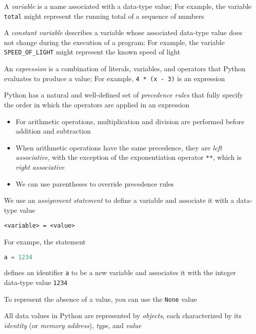 \documentclass[8pt,a4paper,compress]{beamer}
\begin{document}
\begin{frame}[fragile]
A \emph{variable} is a name associated with a data-type value; For example, the variable \lstinline{total} might represent the running total of a sequence of numbers

\bigskip

A \emph{constant variable} describes a variable whose associated data-type value does not change during the execution of a program; For example, the variable \lstinline{SPEED_OF_LIGHT} might represent the known speed of light

\bigskip

An \emph{expression} is a combination of literals, variables, and operators that Python evaluates to produce a value; For example, \lstinline{4 * (x - 3)} is an expression

\bigskip

Python has a natural and well-defined set of \emph{precedence rules} that fully specify the order in which the operators are applied in an expression
\begin{itemize}
\item For arithmetic operations, multiplication and division are performed before addition and subtraction

\item When arithmetic operations have the same precedence, they are \emph{left associative}, with the exception of the exponentiation operator \lstinline{**}, which is \emph{right associative}

\item We can use parentheses to override precedence rules
\end{itemize} 
\end{frame}

\begin{frame}[fragile]
We use an \emph{assignment statement} to define a variable and associate it with a data-type value
\begin{lstlisting}[language={}]
<variable> = <value>
\end{lstlisting}
For exampe, the statement 
\begin{lstlisting}[language=Python]
a = 1234
\end{lstlisting}
defines an identifier \lstinline{a} to be a new variable and associates it with the integer data-type value \lstinline{1234}

\bigskip

To represent the absence of a value, you can use the \lstinline{None} value

\bigskip

All data values in Python are represented by \emph{objects}, each characterized by its \emph{identity} (or \emph{memory address}), \emph{type}, and \emph{value}
\end{frame}
\end{document}
